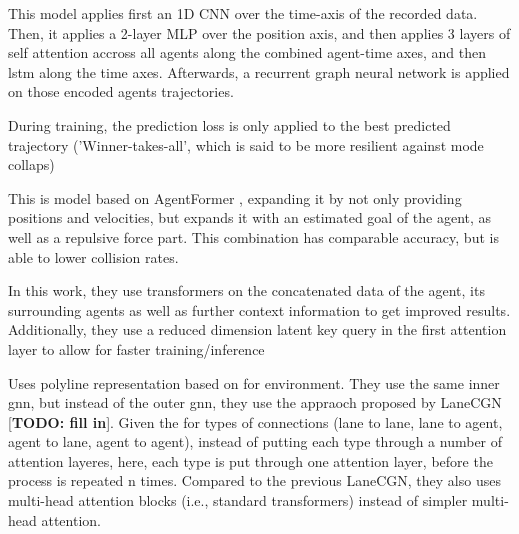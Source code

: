 \cite{zhou2023csr}


\cite{peng2023mrgtraj}


\cite{cheng2023gatraj} This model applies first an 1D CNN over the time-axis of the recorded data. Then, it applies a 2-layer MLP over the position axis, and then applies 3 layers of self attention accross all agents along the combined agent-time axes, and then lstm along the time axes. Afterwards, a recurrent graph neural network is applied on those encoded agents trajectories. 

During training, the prediction loss is only applied to the best predicted trajectory ('Winner-takes-all', which is said to be more resilient against mode collaps)


\cite{narayanan2023ewarenet}


\cite{zhang2023forceformer} This is model based on AgentFormer \cite{yuan2021agentformer}, expanding it by not only providing positions and velocities, but expands it with an estimated goal of the agent, as well as a repulsive force part. This combination has comparable accuracy, but is able to lower collision rates.


\cite{nayakanti2023wayformer} In this work, they use transformers on the concatenated data of the agent, its surrounding agents as well as further context information to get improved results. Additionally, they use a reduced dimension latent key query in the first attention layer to allow for faster training/inference


\cite{aydemir2023adapt} Uses polyline representation based on \cite{gao2020vectornet} for environment. They use the same inner gnn, but instead of the outer gnn, they use the appraoch proposed by LaneCGN [\textbf{TODO: fill in}]. Given the for types of connections (lane to lane, lane to agent, agent to lane, agent to agent), instead of putting each type through a number of attention layeres, here, each type is put through one attention layer, before the process is repeated n times. Compared to the previous LaneCGN, they also uses multi-head attention blocks (i.e., standard transformers) instead of simpler multi-head attention.

